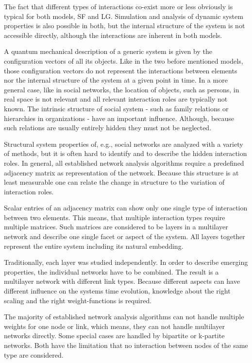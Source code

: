 \documentclass[a4paper,10pt]{scrbook}
\begin{document}
The fact that different types of interactions co-exist more or less obviously is typical for both models, SF and LG. Simulation and analysis of dynamic system properties is also possible in both, but the internal structure of the system is not accessible directly, although the interactions are inherent in both models. 

A quantum mechanical description of a generic system is given by the configuration vectors of all its objects. Like in the two before mentioned models, those configuration vectors do not represent the interactions between elements nor the internal structure of the system at a given point in time.  In a more general case, like in social networks, the location of objects, such as persons, in real space is not relevant and all relevant interaction roles are typically not known. The intrinsic structure of social system - such as family relations or hierarchies in organizations - have an important influence. Although, because such relations are usually entirely hidden they must not be neglected. 

Structural system properties of, e.g., social networks are analyzed with a variety of methods, but it is often hard to identify and to describe the hidden interaction roles. In general, all established network analysis algorithms require a predefined adjacency matrix as representation of the network. Because this structure is at least measurable one can relate the change in structure to the variation of interaction roles. 

Scalar entries of an adjacency matrix can show only one single type of interaction between two elements. This means, that multiple interaction types require multiple matrices. Such matrices are considered to be layers in a multilayer network and describe one single facet or aspect of the system. All layers together represent the entire system including its natural embedding. 

Traditionally, each layer was studied independently. In order to describe emerging properties, the individual networks have to be combined. The result is a multilayer network with different link types. Because different aspects can have different influence on the systems time evolution, knowledge about the right scaling and the right weight-functions is required.
 
The majority of established network analysis algorithms can not handle multiple weights for one node or link, which means, they can not handle multilayer networks directly. Some special cases are handled by bipartite or k-partite networks. Both have the limitation that no interaction between nodes of the same type are considered.
\end{document}
